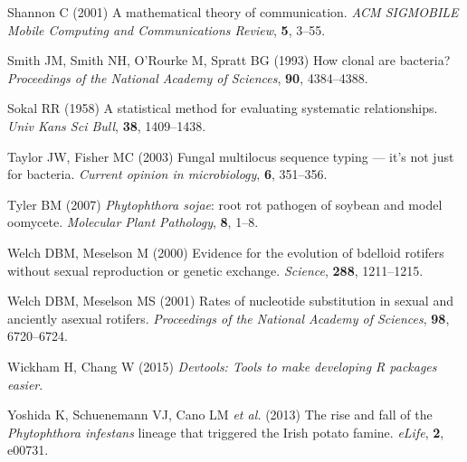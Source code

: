 \documentclass[double,12pt]{beavtex}
\begin{document}
  \hypertarget{ref-shannon2001mathematical}{}
  Shannon C (2001) A mathematical theory of communication. \emph{ACM
  SIGMOBILE Mobile Computing and Communications Review}, \textbf{5},
  3--55.
  
  \hypertarget{ref-smith1993how}{}
  Smith JM, Smith NH, O'Rourke M, Spratt BG (1993) How clonal are
  bacteria? \emph{Proceedings of the National Academy of Sciences},
  \textbf{90}, 4384--4388.
  
  \hypertarget{ref-sokal1958statistical}{}
  Sokal RR (1958) A statistical method for evaluating systematic
  relationships. \emph{Univ Kans Sci Bull}, \textbf{38}, 1409--1438.
  
  \hypertarget{ref-taylor2003fungal}{}
  Taylor JW, Fisher MC (2003) Fungal multilocus sequence typing --- it's
  not just for bacteria. \emph{Current opinion in microbiology},
  \textbf{6}, 351--356.
  
  \hypertarget{ref-tyler2007phytophthora}{}
  Tyler BM (2007) \emph{Phytophthora sojae}: root rot pathogen of soybean
  and model oomycete. \emph{Molecular Plant Pathology}, \textbf{8}, 1--8.
  
  \hypertarget{ref-welch2000evidence}{}
  Welch DBM, Meselson M (2000) Evidence for the evolution of bdelloid
  rotifers without sexual reproduction or genetic exchange.
  \emph{Science}, \textbf{288}, 1211--1215.
  
  \hypertarget{ref-welch2001rates}{}
  Welch DBM, Meselson MS (2001) Rates of nucleotide substitution in sexual
  and anciently asexual rotifers. \emph{Proceedings of the National
  Academy of Sciences}, \textbf{98}, 6720--6724.
  
  \hypertarget{ref-wickham2015devtools}{}
  Wickham H, Chang W (2015) \emph{Devtools: Tools to make developing R
  packages easier}.
  
  \hypertarget{ref-yoshida2013rise}{}
  Yoshida K, Schuenemann VJ, Cano LM \emph{et al.} (2013) The rise and
  fall of the \emph{Phytophthora infestans} lineage that triggered the
  Irish potato famine. \emph{eLife}, \textbf{2}, e00731.
\end{document}
